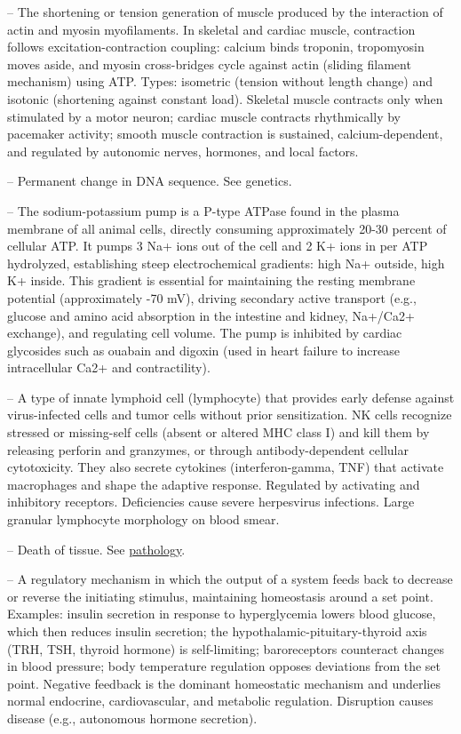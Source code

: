 -- The shortening or tension generation of muscle produced by the interaction of actin and myosin myofilaments. In skeletal and cardiac muscle, contraction follows excitation-contraction coupling: calcium binds troponin, tropomyosin moves aside, and myosin cross-bridges cycle against actin (sliding filament mechanism) using ATP. Types: isometric (tension without length change) and isotonic (shortening against constant load). Skeletal muscle contracts only when stimulated by a motor neuron; cardiac muscle contracts rhythmically by pacemaker activity; smooth muscle contraction is sustained, calcium-dependent, and regulated by autonomic nerves, hormones, and local factors.

-- Permanent change in DNA sequence. See genetics.

-- The sodium-potassium pump is a P-type ATPase found in the plasma membrane of all animal cells, directly consuming approximately 20-30 percent of cellular ATP. It pumps 3 Na+ ions out of the cell and 2 K+ ions in per ATP hydrolyzed, establishing steep electrochemical gradients: high Na+ outside, high K+ inside. This gradient is essential for maintaining the resting membrane potential (approximately -70 mV), driving secondary active transport (e.g., glucose and amino acid absorption in the intestine and kidney, Na+/Ca2+ exchange), and regulating cell volume. The pump is inhibited by cardiac glycosides such as ouabain and digoxin (used in heart failure to increase intracellular Ca2+ and contractility).

-- A type of innate lymphoid cell (lymphocyte) that provides early defense against virus-infected cells and tumor cells without prior sensitization. NK cells recognize stressed or missing-self cells (absent or altered MHC class I) and kill them by releasing perforin and granzymes, or through antibody-dependent cellular cytotoxicity. They also secrete cytokines (interferon-gamma, TNF) that activate macrophages and shape the adaptive response. Regulated by activating and inhibitory receptors. Deficiencies cause severe herpesvirus infections. Large granular lymphocyte morphology on blood smear.

-- Death of tissue. See \hyperlink{Pathology}{pathology}.

-- A regulatory mechanism in which the output of a system feeds back to decrease or reverse the initiating stimulus, maintaining homeostasis around a set point. Examples: insulin secretion in response to hyperglycemia lowers blood glucose, which then reduces insulin secretion; the hypothalamic-pituitary-thyroid axis (TRH, TSH, thyroid hormone) is self-limiting; baroreceptors counteract changes in blood pressure; body temperature regulation opposes deviations from the set point. Negative feedback is the dominant homeostatic mechanism and underlies normal endocrine, cardiovascular, and metabolic regulation. Disruption causes disease (e.g., autonomous hormone secretion).

